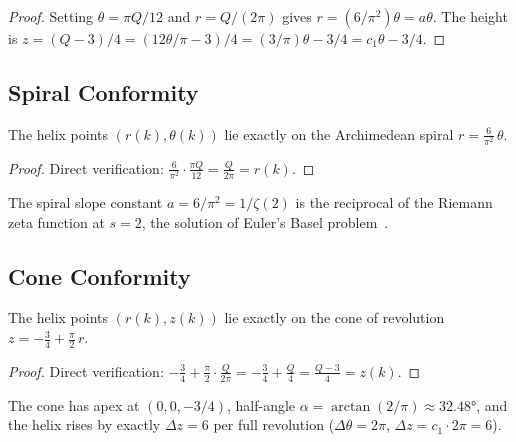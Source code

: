 \begin{proof}
Setting $\theta = \pi Q/12$ and $r = Q/(2\pi)$ gives
$r = (6/\pi^2)\theta = a\theta$. The height is
$z = (Q-3)/4 = (12\theta/\pi - 3)/4 = (3/\pi)\theta - 3/4 = c_1\theta - 3/4$.
\end{proof}

\subsection{Spiral Conformity}\label{subsec:spiral}

\begin{theorem}\label{thm:spiral}
The helix points $(r(k), \theta(k))$ lie exactly on the Archimedean
spiral $r = \frac{6}{\pi^2}\,\theta$.
\end{theorem}

\begin{proof}
Direct verification:
$\frac{6}{\pi^2}\cdot\frac{\pi Q}{12}
  = \frac{Q}{2\pi}
  = r(k)$.
\end{proof}

\begin{remark}
The spiral slope constant $a = 6/\pi^2 = 1/\zeta(2)$ is the reciprocal
of the Riemann zeta function at $s = 2$, the solution of Euler's
Basel problem~\cite{Euler1740, Hardy2008}.
\end{remark}

\subsection{Cone Conformity}\label{subsec:cone}

\begin{theorem}\label{thm:cone}
The helix points $(r(k), z(k))$ lie exactly on the cone of revolution
$z = -\frac{3}{4} + \frac{\pi}{2}\,r$.
\end{theorem}

\begin{proof}
Direct verification:
$-\frac{3}{4} + \frac{\pi}{2}\cdot\frac{Q}{2\pi}
  = -\frac{3}{4} + \frac{Q}{4}
  = \frac{Q-3}{4}
  = z(k)$.
\end{proof}

\begin{remark}
The cone has apex at $(0, 0, -3/4)$, half-angle
$\alpha = \arctan(2/\pi) \approx 32.48°$, and the helix rises by
exactly $\Delta z = 6$ per full revolution
($\Delta\theta = 2\pi$, $\Delta z = c_1 \cdot 2\pi = 6$).
\end{remark}

